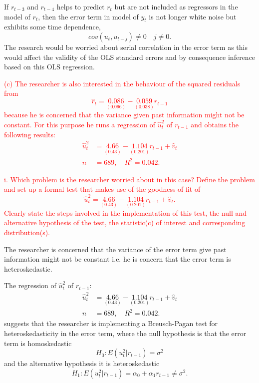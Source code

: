 \documentclass[12pt]{report}
\begin{document}
\noindent If $r_{t-3}$ and $r_{t-4}$ helps to predict $r_t$ but are not included as regressors in the model of $r_t$, then the error term in model of $y_t$ is not longer white noise but exhibits some time dependence, $$cov(u_t, u_{t-j}) \neq 0 \quad j\neq0.$$ The research would be worried about serial correlation in the error term as this would affect the validity of the OLS standard errors and by consequence inference based on this OLS regression.

\noindent \textcolor{red}{(c) The researcher is also interested in the behaviour of the squared residuals from $$\hat{r}_t = \underset{(0.096)}{0.086} - \underset{(0.038)}{0.059}r_{t-1}$$ because he is concerned that the variance given past information might not be constant. For this purpose he runs a regression of $\hat{u}^2_t$ of $r_{t-1}$ and obtains the following results: \begin{align*}
	\hat{u}^2_t &= \underset{(0.43)}{4.66} - \underset{(0.201)}{1.104}r_{t-1} + \hat{v}_t \\
	n&=689, \quad R^2 = 0.042.
	\end{align*}}

\noindent \textcolor{red}{i. Which problem is the researcher worried about in this case? Define the problem and set up a formal test that makes use of the goodness-of-fit of $$\hat{u}^2_t = \underset{(0.43)}{4.66} - \underset{(0.201)}{1.104}r_{t-1} + \hat{v}_t.$$ Clearly state the steps involved in the implementation of this test, the null and alternative hypothesis of the test, the statistic(c) of interest and corresponding distribution(s).}

\noindent The researcher is concerned that the variance of the error term give past information might not be constant i.e. he is concern that the error term is heteroskedastic.

\noindent The regression of $\hat{u}^2_t$ of $r_{t-1}$: \begin{align*}
\hat{u}^2_t &= \underset{(0.43)}{4.66} - \underset{(0.201)}{1.104}r_{t-1} + \hat{v}_t \\
n&=689, \quad R^2 = 0.042.
\end{align*} suggests that the researcher is implementing a Breusch-Pagan test for heteroskedasticity in the error term, where the null hypothesis is that the error term is homoskedastic $$H_0: E(u_t^2|r_{t-1}) = \sigma^2$$ and the alternative hypothesis it is heteroskedastic $$H_1: E(u_t^2|r_{t-1}) = \alpha_0 + \alpha_1r_{t-1} \neq \sigma^2.$$
\end{document}
